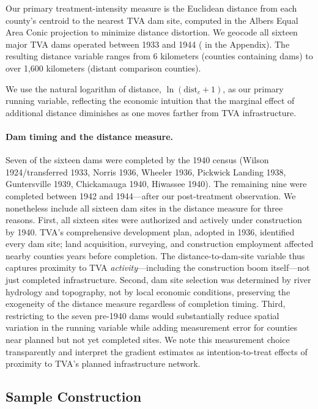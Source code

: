 \documentclass[12pt]{article}
\begin{document}
Our primary treatment-intensity measure is the Euclidean distance from each county's centroid to the nearest TVA dam site, computed in the Albers Equal Area Conic projection to minimize distance distortion. We geocode all sixteen major TVA dams operated between 1933 and 1944 ( in the Appendix). The resulting distance variable ranges from 6 kilometers (counties containing dams) to over 1,600 kilometers (distant comparison counties).

We use the natural logarithm of distance, $\ln(\text{dist}_c + 1)$, as our primary running variable, reflecting the economic intuition that the marginal effect of additional distance diminishes as one moves farther from TVA infrastructure.

\paragraph{Dam timing and the distance measure.} Seven of the sixteen dams were completed by the 1940 census (Wilson 1924/transferred 1933, Norris 1936, Wheeler 1936, Pickwick Landing 1938, Guntersville 1939, Chickamauga 1940, Hiwassee 1940). The remaining nine were completed between 1942 and 1944---after our post-treatment observation. We nonetheless include all sixteen dam sites in the distance measure for three reasons. First, all sixteen sites were authorized and actively under construction by 1940. TVA's comprehensive development plan, adopted in 1936, identified every dam site; land acquisition, surveying, and construction employment affected nearby counties years before completion. The distance-to-dam-site variable thus captures proximity to TVA \textit{activity}---including the construction boom itself---not just completed infrastructure. Second, dam site selection was determined by river hydrology and topography, not by local economic conditions, preserving the exogeneity of the distance measure regardless of completion timing. Third, restricting to the seven pre-1940 dams would substantially reduce spatial variation in the running variable while adding measurement error for counties near planned but not yet completed sites. We note this measurement choice transparently and interpret the gradient estimates as intention-to-treat effects of proximity to TVA's planned infrastructure network.

\subsection{Sample Construction}
\end{document}
